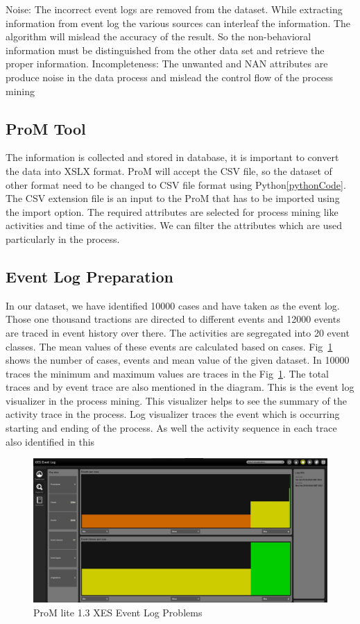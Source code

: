 Noise: The incorrect event logs are removed from the dataset.
While extracting information from event log the various
sources can interleaf the information. The algorithm will
mislead the accuracy of the result. So the non-behavioral
information must be distinguished from the other data set and
retrieve the proper information.
Incompleteness: The unwanted and NAN attributes are produce noise in
the data process and mislead the control flow of the process
mining

\subsection{ProM Tool}
The information is collected and stored in database, it is
important to convert the data into XSLX format. ProM will accept the CSV file, so the dataset
of other format need to be changed to CSV file format using Python\ref{pythonCode}. The
CSV extension file is an input to the ProM that has to be
imported using the import option. The required attributes are
selected for process mining like activities and time of the
activities. We can filter the attributes which are used
particularly in the process.

\subsection{Event Log Preparation}

In our dataset, we have identified 10000 cases and have taken as the event log. Those one thousand tractions are directed to different events and 12000 events are traced in event history over there. The activities are segregated into 20 event classes. The mean values of these events are calculated based on cases. Fig~\ref{figure:promXESEvent} shows the number of cases, events and mean value of the given dataset. In 10000 traces the minimum and maximum values are traces in the Fig~\ref{figure:promXESEvent}. The total traces and by event trace are also mentioned in the diagram. This is the event log visualizer in the process mining. This visualizer helps to see the summary of the activity trace in the process. Log visualizer traces the event which is occurring starting and ending of the process. As well the activity sequence in each trace also identified in this

\begin{figure}[!htb]
    \centering 
    \includegraphics[scale=0.3]{resource/XESEventLog.JPG}
    \caption{ProM lite 1.3 XES Event Log Problems}
    \label{figure:promXESEvent}
\end{figure}

